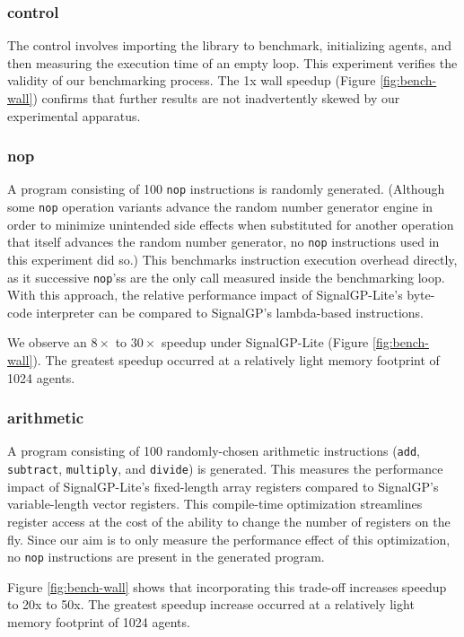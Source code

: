 \subsubsection{control}

The control involves importing the library to benchmark, initializing agents, and then measuring the execution time of an empty loop. This experiment verifies the validity of our benchmarking process.
The 1x wall speedup (Figure \ref{fig:bench-wall}) confirms that further results are not inadvertently skewed by our experimental apparatus.

\subsubsection{nop}

A program consisting of 100 \texttt{nop} instructions is randomly generated.
(Although some \texttt{nop} operation variants advance the random number generator engine in order to minimize unintended side effects when substituted for another operation that itself advances the random number generator, no \texttt{nop} instructions used in this experiment did so.)
This benchmarks instruction execution overhead directly, as it successive \texttt{nop}'ss are the only call measured inside the benchmarking loop.
With this approach, the relative performance impact of SignalGP-Lite's byte-code interpreter can be compared to SignalGP's lambda-based instructions.

We observe an $8\times$ to $30\times$ speedup under SignalGP-Lite (Figure \ref{fig:bench-wall}).
The greatest speedup occurred at a relatively light memory footprint of 1024 agents.

\subsubsection{arithmetic}

A program consisting of 100 randomly-chosen arithmetic instructions (\texttt{add}, \texttt{subtract}, \texttt{multiply}, and \texttt{divide}) is generated.
This measures the performance impact of SignalGP-Lite's fixed-length array registers compared to SignalGP's variable-length vector registers.
This compile-time optimization streamlines register access at the cost of the ability to change the number of registers on the fly.
Since our aim is to only measure the performance effect of this optimization, no \texttt{nop} instructions are present in the generated program.

Figure \ref{fig:bench-wall} shows that incorporating this trade-off increases speedup to 20x to 50x.
The greatest speedup increase occurred at a relatively light memory footprint of 1024 agents.

